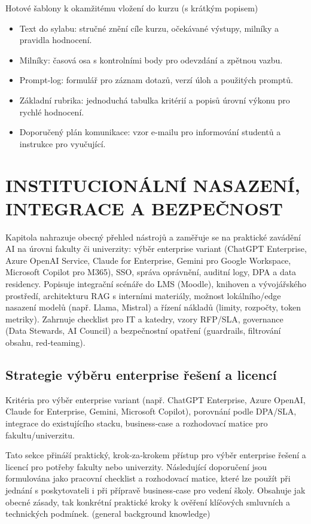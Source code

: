 \documentclass{report}%
\begin{document}
\bigskip

Hotové šablony k okamžitému vložení do kurzu (s krátkým popisem)
\begin{itemize}
  \item Text do sylabu: stručné znění cíle kurzu, očekávané výstupy, milníky a pravidla hodnocení.
  \item Milníky: časová osa s kontrolními body pro odevzdání a zpětnou vazbu.
  \item Prompt-log: formulář pro záznam dotazů, verzí úloh a použitých promptů.
  \item Základní rubrika: jednoduchá tabulka kritérií a popisů úrovní výkonu pro rychlé hodnocení.
  \item Doporučený plán komunikace: vzor e-mailu pro informování studentů a instrukce pro vyučující.
\end{itemize}%

%
\chapter{INSTITUCIONÁLNÍ NASAZENÍ, INTEGRACE A BEZPEČNOST}%
Kapitola nahrazuje obecný přehled nástrojů a zaměřuje se na praktické zavádění AI na úrovni fakulty či univerzity: výběr enterprise variant (ChatGPT Enterprise, Azure OpenAI Service, Claude for Enterprise, Gemini pro Google Workspace, Microsoft Copilot pro M365), SSO, správa oprávnění, auditní logy, DPA a data residency. Popisuje integrační scénáře do LMS (Moodle), knihoven a vývojářského prostředí, architekturu RAG s interními materiály, možnost lokálního/edge nasazení modelů (např. Llama, Mistral) a řízení nákladů (limity, rozpočty, token metriky). Zahrnuje checklist pro IT a katedry, vzory RFP/SLA, governance (Data Stewards, AI Council) a bezpečnostní opatření (guardrails, filtrování obsahu, red‑teaming).%
\section{Strategie výběru enterprise řešení a licencí}%
Kritéria pro výběr enterprise variant (např. ChatGPT Enterprise, Azure OpenAI, Claude for Enterprise, Gemini, Microsoft Copilot), porovnání podle DPA/SLA, integrace do existujícího stacku, business‑case a rozhodovací matice pro fakultu/univerzitu.%


%
Tato sekce přináší praktický, krok‑za‑krokem přístup pro výběr enterprise řešení a licencí pro potřeby fakulty nebo univerzity. Následující doporučení jsou formulována jako pracovní checklist a rozhodovací matice, které lze použít při jednání s poskytovateli i při přípravě business‑case pro vedení školy. Obsahuje jak obecné zásady, tak konkrétní praktické kroky k ověření klíčových smluvních a technických podmínek. (general background knowledge)
\end{document}
